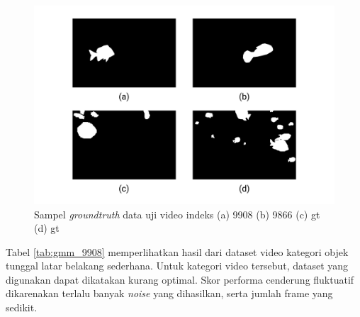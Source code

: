         \vspace{-0.5cm}
        \begin{figure}[H]
        \centering
          \singlespacing
          \captionsetup{justification=centering,margin=0.5cm}
          \includegraphics[width=14cm]{image/sample_groundtruth.jpg}
          \caption{Sampel \textit{groundtruth} data uji video indeks (a) 9908 (b) 9866 (c) gt (d) gt}
          \label{fig:sample_groundtruth}
        \end{figure}

        Tabel \ref{tab:gmm_9908} memperlihatkan hasil dari dataset video kategori objek tunggal latar belakang sederhana. Untuk kategori video tersebut, dataset yang digunakan dapat dikatakan kurang optimal. Skor performa cenderung fluktuatif dikarenakan terlalu banyak \textit{noise} yang dihasilkan, serta jumlah frame yang sedikit.

